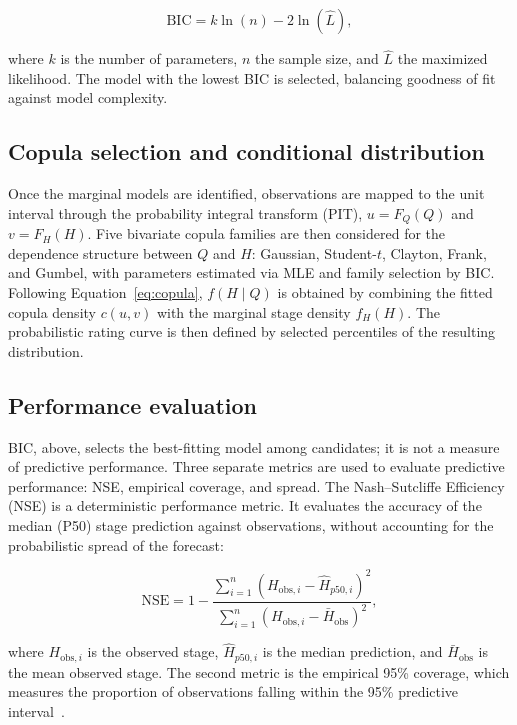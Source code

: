\documentclass[11pt]{article}
\begin{document}
\begin{equation}
    \text{BIC} = k \ln(n) - 2 \ln(\hat{L}),
\end{equation}

where $k$ is the number of parameters, $n$ the sample size, and $\hat{L}$ the maximized likelihood. The model with the lowest BIC is selected, balancing goodness of fit against model complexity.

\subsection{Copula selection and conditional distribution}
Once the marginal models are identified, observations are mapped to the unit interval through the probability integral transform (PIT), $u = F_Q(Q)$ and $v = F_H(H)$. Five bivariate copula families are then considered for the dependence structure between $Q$ and $H$: Gaussian, Student-$t$, Clayton, Frank, and Gumbel, with parameters estimated via MLE and family selection by BIC. Following Equation~\ref{eq:copula}, $f(H \mid Q)$ is obtained by combining the fitted copula density $c(u,v)$ with the marginal stage density $f_H(H)$. The probabilistic rating curve is then defined by selected percentiles of the resulting distribution. 

\subsection{Performance evaluation}
BIC, above, selects the best-fitting model among candidates; it is not a measure of predictive performance. Three separate metrics are used to evaluate predictive performance: NSE, empirical coverage, and spread. The Nash--Sutcliffe Efficiency (NSE) is a deterministic performance metric. It evaluates the accuracy of the median (P50) stage prediction against observations, without accounting for the probabilistic spread of the forecast: 

\begin{equation}
    \text{NSE} = 1 - 
    \frac{\sum_{i=1}^{n} (H_{\text{obs},i} - \hat{H}_{p50,i})^2}
    {\sum_{i=1}^{n} (H_{\text{obs},i} - \bar{H}_{\text{obs}})^2},
\end{equation}

where $H_{\text{obs},i}$ is the observed stage, $\hat{H}_{p50,i}$ is the median prediction, and $\bar{H}_{\text{obs}}$ is the mean observed stage. The second metric is the empirical 95\% coverage, which measures the proportion of observations falling within the 95\% predictive interval~\citep{christoffersen1998, laio2007}.
\end{document}
